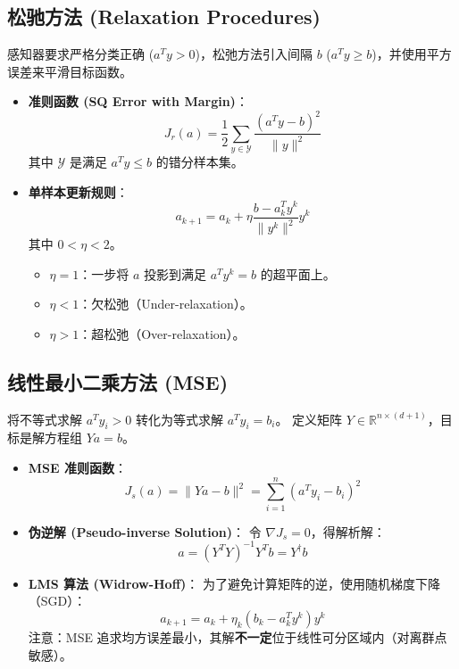 \documentclass[a4paper, 11pt]{ctexart}
\begin{document}
\subsection{松驰方法 (Relaxation Procedures)}
感知器要求严格分类正确 ($a^T y > 0$)，松弛方法引入间隔 $b$ ($a^T y \ge b$)，并使用平方误差来平滑目标函数。

\begin{itemize}
    \item \textbf{准则函数 (SQ Error with Margin)}：
    \begin{equation}
        J_r(a) = \frac{1}{2} \sum_{y \in \mathcal{Y}} \frac{(a^T y - b)^2}{\|y\|^2}
    \end{equation}
    其中 $\mathcal{Y}$ 是满足 $a^T y \le b$ 的错分样本集。
    \item \textbf{单样本更新规则}：
    \begin{equation}
        a_{k+1} = a_k + \eta \frac{b - a_k^T y^k}{\|y^k\|^2} y^k
    \end{equation}
    其中 $0 < \eta < 2$。
    \begin{itemize}
        \item $\eta = 1$：一步将 $a$ 投影到满足 $a^T y^k = b$ 的超平面上。
        \item $\eta < 1$：欠松弛（Under-relaxation）。
        \item $\eta > 1$：超松弛（Over-relaxation）。
    \end{itemize}
\end{itemize}

\subsection{线性最小二乘方法 (MSE)}
将不等式求解 $a^T y_i > 0$ 转化为等式求解 $a^T y_i = b_i$。
定义矩阵 $Y \in \mathbb{R}^{n \times (d+1)}$，目标是解方程组 $Ya = b$。

\begin{itemize}
    \item \textbf{MSE 准则函数}：
    \begin{equation}
        J_s(a) = \|Ya - b\|^2 = \sum_{i=1}^n (a^T y_i - b_i)^2
    \end{equation}
    \item \textbf{伪逆解 (Pseudo-inverse Solution)}：
    令 $\nabla J_s = 0$，得解析解：
    \begin{equation}
        a = (Y^T Y)^{-1} Y^T b = Y^\dagger b
    \end{equation}
    \item \textbf{LMS 算法 (Widrow-Hoff)}：
    为了避免计算矩阵的逆，使用随机梯度下降（SGD）：
    \begin{equation}
        a_{k+1} = a_k + \eta_k (b_k - a_k^T y^k) y^k
    \end{equation}
    注意：MSE 追求均方误差最小，其解\textbf{不一定}位于线性可分区域内（对离群点敏感）。
\end{itemize}
\end{document}
